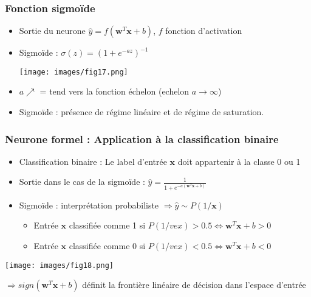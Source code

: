 \documentclass[9pt]{beamer}
\newcommand \ve[1]{\mathbf{#1}}
\begin{document}
\begin{frame}
\frametitle{Fonction sigmoïde}
\begin{itemize}
\item Sortie du neurone $\hat{y}=f\left(\ve{w}^T\ve{x}+b\right)$, $f$ fonction d'activation
\item Sigmoïde : $\sigma(z)=(1+e^{-az})^{-1}$
\begin{center}
\texttt{[image: images/fig17.png]}
\end{center}
\item $a\nearrow$ = tend vers la fonction échelon (echelon $a\rightarrow\infty$)
\item Sigmoïde : présence de régime linéaire et de régime de saturation.
\end{itemize}
\end{frame}

\begin{frame}
\frametitle{Neurone formel : Application à la classification binaire}
\begin{itemize}
\item Classification binaire : Le label d'entrée $\ve{x}$ doit appartenir à la classe 0 ou 1
\item Sortie dans le cas de la sigmoïde : $\hat{y}=\frac{1}{1+e^{-a\left(\ve{w}^T\ve{x}+b\right)}}$
\item Sigmoïde : interprétation probabiliste $\Rightarrow \hat{y}\sim P\left(1/\ve{x}\right)$
\begin{itemize}
\item Entrée $\ve{x}$ classifiée comme 1 si $P\left(1/ve{x}\right) > 0.5 \Leftrightarrow \ve{w}^T\ve{x}+b>0$
\item Entrée $\ve{x}$ classifiée comme 0 si $P\left(1/ve{x}\right) < 0.5 \Leftrightarrow \ve{w}^T\ve{x}+b<0$
\end{itemize}
\end{itemize}
\begin{center}
\texttt{[image: images/fig18.png]}
\end{center}
\begin{alertblock}{}
$\Rightarrow sign \left(\ve{w}^T\ve{x}+b\right)$ définit la frontière linéaire de décision dans l'espace d'entrée
\end{alertblock}
\end{frame}
\end{document}
